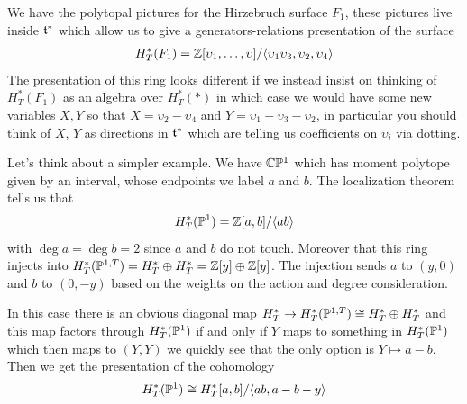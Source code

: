 \documentclass[12pt]{article}
\begin{document}
\begin{example}
    We have the polytopal pictures for the Hirzebruch surface $F_1$, these pictures live inside $\mf t^*$ which allow us to give a generators-relations presentation of the surface \begin{align*}
        H^*_T(F_1) = \Z[\upsilon_1,\dots,\upsilon]/\ideal{\upsilon_1\upsilon_3,\upsilon_2,\upsilon_4}
    \end{align*} The presentation of this ring looks different if we instead insist on thinking of $H_T^*(F_1)$ as an algebra over $H_T^*(*)$ in which case we would have some new variables $X,Y$ so that $X = \upsilon_2 - \upsilon_4$ and $Y = \upsilon_1 - \upsilon_3 - \upsilon_2$, in particular you should think of $X$, $Y$ as directions in $\mf t^*$ which are telling us coefficients on $\upsilon_i$ via dotting.
\end{example}

\begin{example}
    Let's think about a simpler example. We have $\C\P^1$ which has moment polytope given by an interval, whose endpoints we label $a$ and $b$. The localization theorem tells us that \begin{align*}
        H_T^*(\P^1) = \Z[a,b]/\ideal{ab}
    \end{align*} with $\deg a = \deg b = 2$ since $a$ and $b$ do not touch. Moreover that this ring injects into $H_T^*(\P^{1,T}) = H_T^* \oplus H_T^* = \Z[y]\oplus\Z[y]$. The injection sends $a$ to $(y,0)$ and $b$ to $(0,-y)$ based on the weights on the action and degree consideration. 

    \hfill
    

    \hfill

    In this case there is an obvious diagonal map $H_T^*\to H_T^*(\P^{1,T}) \cong H_T^* \oplus H_T^*$ and this map factors through $H_T^*(\P^1)$ if and only if $Y$ maps to something in $H_T^*(\P^1)$ which then maps to $(Y,Y)$ we quickly see that the only option is $Y\mapsto a-b$. Then we get the presentation of the cohomology \begin{align}
        H_T^*(\P^1) \cong H_T^*[a,b]/\ideal{ab,a-b-y}
    \end{align}

\end{example}
\end{document}

